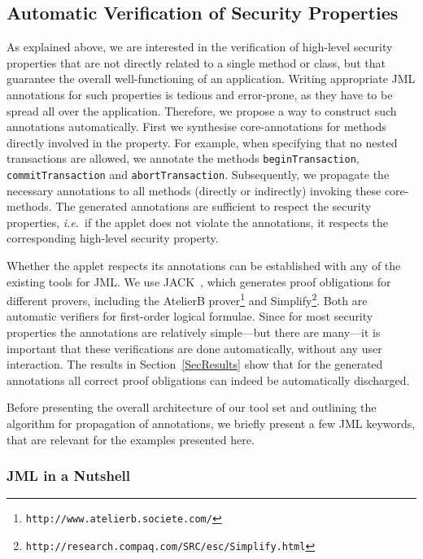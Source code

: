 \subsection{Automatic Verification of Security Properties}\label{SecVerif}

As explained above, we are interested in the verification of
high-level security properties that are not directly related to a
single method or class, but that guarantee the overall
well-functioning of an application. Writing appropriate JML
annotations for such properties is tedious and error-prone, as they
have to be spread all over the application. Therefore, we propose a
way to construct such annotations automatically. First we synthesise
core-annotations for methods directly involved in the property.  For
example, when specifying that no nested transactions are allowed, we
annotate the methods \texttt{beginTransaction},
\texttt{commitTransaction} and
\texttt{abortTransaction}. Subsequently, we propagate the necessary 
annotations to all methods (directly or indirectly) invoking these
core-methods.  The generated annotations are sufficient to respect the
security properties, \emph{i.e.}~if the applet does not violate the
annotations, it respects the corresponding high-level security
property.

Whether the applet respects its annotations can be established with
any of the existing tools for JML. We use JACK~\cite{BRL-JACK}, which
generates proof obligations for different provers, including the
AtelierB prover\footnote{\texttt{http://www.atelierb.societe.com/}}
and
Simplify\footnote{\texttt{http://research.compaq.com/SRC/esc/Simplify.html}}.
Both are automatic verifiers for first-order logical formulae. Since
for most security properties the annotations are relatively
simple---but there are many---it is important that these verifications
are done automatically, without any user interaction. The results in
Section~\ref{SecResults} show that for the generated annotations all
correct proof obligations can indeed be automatically discharged.

Before presenting the overall architecture of our tool set and
outlining the algorithm for propagation of annotations, we briefly
present a few JML keywords, that are relevant for the examples
presented here.

\subsubsection{JML in a Nutshell}\label{SubSecJML}

